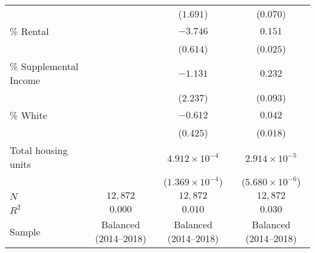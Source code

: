 \begin{table}[tbh]
\begin{threeparttable}
\begin{tabular}{lccc}
                            &                                   &                         ($1.691$) &                         ($0.070$) \\
\% Rental                   &                                   &                          $-3.746$ &                           $0.151$ \\
                            &                                   &                         ($0.614$) &                         ($0.025$) \\
\% Supplemental Income      &                                   &                          $-1.131$ &                           $0.232$ \\
                            &                                   &                         ($2.237$) &                         ($0.093$) \\
\% White                    &                                   &                          $-0.612$ &                           $0.042$ \\
                            &                                   &                         ($0.425$) &                         ($0.018$) \\
Total housing units         &                                   &            $4.912 \times 10^{-4}$ &            $2.914 \times 10^{-5}$ \\
                            &                                   &          ($1.369 \times 10^{-4}$) &          ($5.680 \times 10^{-6}$) \\
$N$                         &                          $12,872$ &                          $12,872$ &                          $12,872$ \\
$R^2$                       &                           $0.000$ &                           $0.010$ &                           $0.030$ \\
Sample                      &             Balanced (2014--2018) &             Balanced (2014--2018) &             Balanced (2014--2018) \\
\bottomrule
\end{tabular}

        \begin{tablenotes}
        \footnotesize
        \item 
        \end{tablenotes}
        \end{threeparttable}

        \end{table}
        